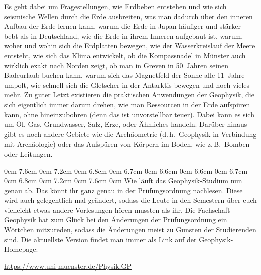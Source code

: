 \begin{multicols}{2}
Es geht dabei um Fragestellungen, wie Erdbeben entstehen und wie sich seismische Wellen durch die Erde ausbreiten, was man dadurch über den inneren Aufbau der Erde lernen kann, warum die Erde in Japan häufiger und stärker bebt als in Deutschland, wie die Erde in ihrem Inneren aufgebaut ist, warum, woher und wohin sich die Erdplatten bewegen, wie der Wasserkreislauf der Meere entsteht, wie sich das Klima entwickelt, ob die Kompassnadel in Münster auch wirklich exakt nach Norden zeigt, ob man in Greven in 50~Jahren seinen Badeurlaub buchen kann, warum sich das Magnetfeld der Sonne alle 11~Jahre umpolt, wie schnell sich die Gletscher in der Antarktis bewegen und noch vieles mehr.
Zu guter Letzt existieren die praktischen Anwendungen der Geophysik, die sich eigentlich immer darum drehen, wie man Ressourcen in der Erde aufspüren kann, ohne hineinzubohren (denn das ist unvorstellbar teuer).
Dabei kann es sich um Öl, Gas, Grundwasser, Salz, Erze, oder Ähnliches handeln.
Darüber hinaus gibt es noch andere Gebiete wie die Archäometrie (d.\,h.\ Geophysik in Verbindung mit Archäologie) oder das Aufspüren von Körpern im Boden, wie z.\,B.\ Bomben oder Leitungen.

0cm 7.6cm
0cm 7.2cm
0cm 6.8cm
0cm 6.7cm
0cm 6.6cm
0cm 6.6cm
0cm 6.7cm
0cm 6.8cm
0cm 7.2cm
0cm 7.6cm
0cm \columnwidth
Wie läuft das Geophysik-Studium nun genau ab.
Das könnt ihr ganz genau in der Prüfungsordnung nachlesen.
Diese wird auch gelegentlich mal geändert, sodass die Leute in den Semestern über euch vielleicht etwas andere Vorlesungen hören mussten als ihr.
Die Fachschaft Geophysik hat zum Glück bei den Änderungen der Prüfungsordnung ein Wörtchen mitzureden, sodass die Änderungen meist zu Gunsten der Studierenden sind.
Die aktuellste Version findet man immer als Link auf der Geophysik-Homepage:
\begin{center}
	\url{https://www.uni-muenster.de/Physik.GP}
\end{center}


\end{multicols}
